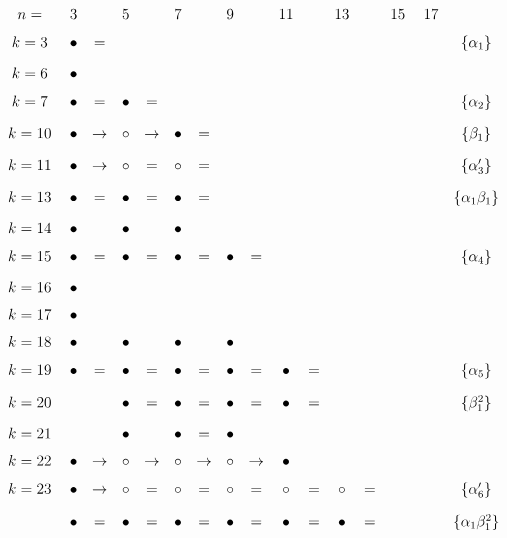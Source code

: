 \documentclass{article}
\begin{document}
\(
\begin{tikzcd}[nodes={font=\large},row sep=0.2cm,column sep=0.1cm]
n= & & 3 & & 5 & & 7 & & 9 & & 11 & & 13 & & 15 & & 17 &  \\
k=3 && \bullet & = && && && && && && && \{\alpha_1\} \\
k=6 && \bullet \\
k=7 && \bullet & = & \bullet & = && && && && && && \{\alpha_2\} \\
k=10 && \bullet & \rightarrow & \circ & \rightarrow & \bullet & = && && && && && \{\beta_1\} \\
k=11 && \bullet & \rightarrow & \circ & = & \circ & = && && && && && \{\alpha'_3\} \\
k=13 && \bullet & = & \bullet &=& \bullet &=&& && && && && \{\alpha_1\beta_1\} \\
k=14 && \bullet && \bullet && \bullet \\
k=15 && \bullet &=& \bullet &=& \bullet &=& \bullet &= && && && && \{\alpha_4\} \\
k=16 && \bullet \\
k=17 && \bullet \\
k=18 && \bullet && \bullet && \bullet && \bullet \\
k=19 && \bullet &=& \bullet &=& \bullet &=& \bullet &=& \bullet &=&& && && \{\alpha_5\} \\
k=20 && && \bullet &=& \bullet &=& \bullet &=& \bullet &=&& && && \{\beta_1^2\} \\
k=21 && && \bullet && \bullet &=& \bullet \\
k=22 && \bullet & \rightarrow & \circ & \rightarrow & \circ & \rightarrow & \circ & \rightarrow & \bullet \\
k=23 && \bullet & \rightarrow & \circ & = & \circ & = & \circ & = & \circ & = & \circ & = && && \{\alpha'_6\} \\
 && \bullet &=& \bullet &=& \bullet &=& \bullet &=& \bullet &=& \bullet & = && && \{\alpha_1\beta_1^2\} \\
\end{tikzcd}
\)
\end{document}
